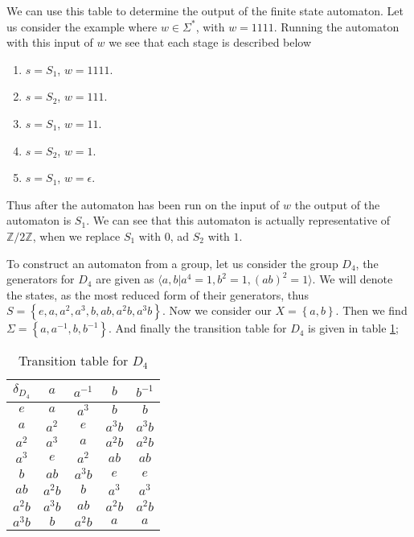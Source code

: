 \documentclass[10pt]{amsart}
\theoremstyle{definition}
\newcommand{\Z}{\mathbb{Z}}
\begin{document}
We can use this table to determine the output of the finite state automaton.
Let us consider the example where $w\in\Sigma^*$, with $w=1111$. Running the
automaton with this input of $w$ we see that each stage is described below
\begin{multicols}{2}
  \begin{enumerate}
    \item $s=S_1$, $w=1111$.
    \item $s=S_2$, $w=111$.
    \item $s=S_1$, $w=11$.
    \item $s=S_2$, $w=1$.
    \item $s=S_1$, $w=\epsilon$.
  \end{enumerate}
\end{multicols}

Thus after the automaton has been run on the input of $w$ the output of the
automaton is $S_1$. We can see that this automaton is actually representative
of $\Z/2\Z$, when we replace $S_1$ with $0$, ad $S_2$ with $1$.

To construct an automaton from a group, let us consider the group $D_4$, the
generators for $D_4$ are given as $\langle a,b | a^4=1, b^2=1,
(ab)^2=1\rangle$. We will denote the states, as the most reduced form of their
generators, thus $S=\left\{e,a,a^2,a^3,b,ab,a^2b,a^3b\right\}$. Now we consider
our $X=\left\{a,b\right\}$. Then we find
$\Sigma=\left\{a,a^{-1},b,b^{-1}\right\}$. And finally the transition table for
$D_4$ is given in table \ref{tab:d4};

\begin{table}[htpb]
  \centering
  \caption{Transition table for $D_4$}
  \label{tab:d4}
  \begin{tabular}{c||c|c|c|c}
    $\delta_{D_4}$ & $a$ & $a^{-1}$ & $b$ & $b^{-1}$\\
    \hline\hline
    $e$ & $a$ & $a^3$ & $b$ & $b$\\
    $a$ & $a^2$ & $e$ & $a^3b$ & $a^3b$\\
    $a^2$ & $a^3$ & $a$ & $a^2b$ & $a^2b$\\
    $a^3$ & $e$ & $a^2$ & $ab$ & $ab$\\
    $b$ & $ab$ & $a^3b$ & $e$ & $e$\\
    $ab$ & $a^2b$ & $b$ & $a^3$ & $a^3$\\
    $a^2b$ & $a^3b$ & $ab$ & $a^2b$ & $a^2b$\\
    $a^3b$ & $b$ & $a^2b$ & $a$ & $a$\\
  \end{tabular}
\end{table}
\end{document}
